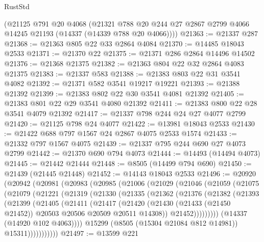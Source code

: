 \begin{lexlean}{RustStd}
\begin{coremodule}
    (@21125
      @791
      @20
      @4068
      (@21321 @788 @20 @244 @27 @2867 @2799 @4066 @14245 @21193 (@14337 (@14339 @788 @20 @4066))))
@21363 := @21337 @287
@21368 := @21363 @805 @22 @33 @2864 @4084
@21370 := @14485 @18043 @2533
@21371 := @21370 @22
@21375 := @21371 @286 @2864 @14496 @14502
@21376 := @21368 @21375
@21382 := @21363 @804 @22 @32 @2864 @4083 @21375
@21383 := @21337 @583
@21388 := @21383 @803 @22 @31 @3541 @4082
@21392 := @21371 @582 @3541 @19217 @19221
@21393 := @21388 @21392
@21399 := @21383 @802 @22 @30 @3541 @4081 @21392
@21405 := @21383 @801 @22 @29 @3541 @4080 @21392
@21411 := @21383 @800 @22 @28 @3541 @4079 @21392
@21417 := @21337 @798 @244 @24 @27 @4077 @2799
@21420 := @21125 @798 @24 @4077
@21422 := @13981 @18043 @2533
@21430 := @21422 @688 @797 @1567 @24 @2867 @4075 @2533 @1574
@21433 := @21332 @797 @1567 @4075
@21439 := @21337 @795 @244 @690 @27 @4073 @2799
@21442 := @21370 @690 @794 @4073
@21444 := @14493 (@14494 @4073)
@21445 := @21442 @21444
@21448 := @8505 (@14499 @794 @690)
@21450 := @21439 (@21445 @21448)
@21452 := @14143 @18043 @2533
@21496 := @20920
    (@20942
      (@20981
        (@20983
          (@20985
            (@21006
              (@21029
                (@21046
                  (@21059
                    (@21075
                      (@21079
                        (@21221
                          (@21319
                            (@21330
                              (@21335
                                (@21362
                                  (@21376
                                    (@21382
                                      (@21393
                                        (@21399
                                          (@21405
                                            (@21411
                                              (@21417
                                                (@21420
                                                  (@21430
                                                    (@21433 (@21450 @21452))
                                                    @20503
                                                    @20506
                                                    @20509
                                                    @20511
                                                    @14308))
                                                @21452)))))))))
                              (@14337 (@14920 @102 @4063))))
                          @15299
                          (@8505 (@15304 @21084 @812 @14981))
                          @15311)))))))))))
@21497 := @13599 @221

\end{coremodule}
\end{lexlean}
